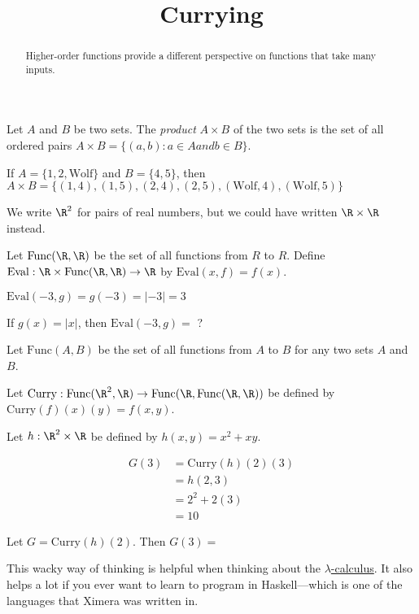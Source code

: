 \documentclass{ximera}
\title{Currying}
\begin{document}
\begin{abstract}
  Higher-order functions provide a different perspective on functions that take many inputs.
\end{abstract}

\begin{definition}
  Let $A$ and $B$ be two sets.  The \textit{product} $A\times B$ of
  the two sets is the set of all ordered pairs $A \times B = \{ (a,b):
  a \in A and b \in B\}$.
\end{definition}

\begin{example}
  If $A = \{ 1,2,\text{Wolf}\}$ and $B = \{4,5\}$, then $A \times B =
  \{(1,4),(1,5),(2,4),(2,5),(\text{Wolf},4),(\text{Wolf},5)\}$
\end{example}

\begin{example}
  We write $\R^2$ for pairs of real numbers, but we could have written
  $\R \times \R$ instead.
\end{example}

\begin{question}
  Let $\text{Func}(\R,\R)$ be the set of all functions from $R$ to
  $R$.  Define $\text{Eval}: \R \times \text{Func}(\R,\R) \to \R$ by
  $\text{Eval}(x,f) = f(x)$.
\begin{solution}
\begin{hint}
	$\text{Eval}(-3,g) = g(-3)=|-3|=3$
\end{hint}
If $g(x) = |x|$, then $\text{Eval}(-3,g)=$ ?
\end{solution}
\end{question}

\begin{question}
  Let $\text{Func}(A,B)$ be the set of all functions from $A$ to $B$ for any two sets $A$ and $B$.  
  
  Let $\text{Curry}:\text{Func}(\R^2,\R) \to  \text{Func}(\R,\text{Func}(\R,\R))$ be defined by $\text{Curry}(f)(x)(y) = f(x,y)$.

  Let $h:\R^2 \times \R$ be defined by $h(x,y) = x^2 +xy$.  
  \begin{solution}
    \begin{hint}
      \begin{align*}
        G(3) &= \text{Curry}(h)(2)(3)\\
        &= h(2,3)\\
        &= 2^2+2(3)\\
        &=10
      \end{align*}
    \end{hint}
    Let $G = \text{Curry}(h)(2)$.  Then $G(3) =$ 
  \end{solution}
  
  This wacky way of thinking is helpful when thinking about the
  \href{http://en.wikipedia.org/wiki/Lambda_calculus}{$\lambda$-calculus}.
  It also helps a lot if you ever want to learn to program in
  Haskell---which is one of the languages that Ximera was written in.
  
\end{question}
\end{document}
